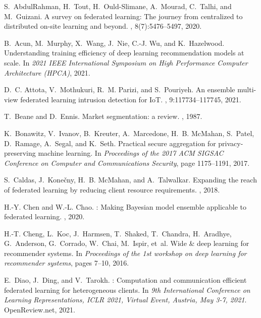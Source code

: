 \documentclass{article}
\begin{document}
\begin{thebibliography}{10}

S.~AbdulRahman, H.~Tout, H.~Ould-Slimane, A.~Mourad, C.~Talhi, and M.~Guizani.
\newblock A survey on federated learning: The journey from centralized to
  distributed on-site learning and beyond.
, 8(7):5476--5497, 2020.

B.~Acun, M.~Murphy, X.~Wang, J.~Nie, C.-J. Wu, and K.~Hazelwood.
\newblock Understanding training efficiency of deep learning recommendation
  models at scale.
\newblock In {\em 2021 IEEE International Symposium on High Performance
  Computer Architecture (HPCA)}, 2021.

D.~C. Attota, V.~Mothukuri, R.~M. Parizi, and S.~Pouriyeh.
\newblock An ensemble multi-view federated learning intrusion detection for
  {IoT}.
, 9:117734--117745, 2021.

T.~Beane and D.~Ennis.
\newblock Market segmentation: a review.
, 1987.

K.~Bonawitz, V.~Ivanov, B.~Kreuter, A.~Marcedone, H.~B. McMahan, S.~Patel,
  D.~Ramage, A.~Segal, and K.~Seth.
\newblock Practical secure aggregation for privacy-preserving machine learning.
\newblock In {\em Proceedings of the 2017 ACM SIGSAC Conference on Computer and
  Communications Security}, page 1175–1191, 2017.

S.~Caldas, J.~Kone{\v{c}}ny, H.~B. McMahan, and A.~Talwalkar.
\newblock Expanding the reach of federated learning by reducing client resource
  requirements.
, 2018.

H.-Y. Chen and W.-L. Chao.
: Making {B}ayesian model ensemble applicable to federated
  learning.
, 2020.

H.-T. Cheng, L.~Koc, J.~Harmsen, T.~Shaked, T.~Chandra, H.~Aradhye,
  G.~Anderson, G.~Corrado, W.~Chai, M.~Ispir, et~al.
\newblock Wide \& deep learning for recommender systems.
\newblock In {\em Proceedings of the 1st workshop on deep learning for
  recommender systems}, pages 7--10, 2016.

E.~Diao, J.~Ding, and V.~Tarokh.
: Computation and communication efficient federated
  learning for heterogeneous clients.
\newblock In {\em 9th International Conference on Learning Representations,
  {ICLR} 2021, Virtual Event, Austria, May 3-7, 2021}. OpenReview.net, 2021.


\end{thebibliography}
\end{document}
